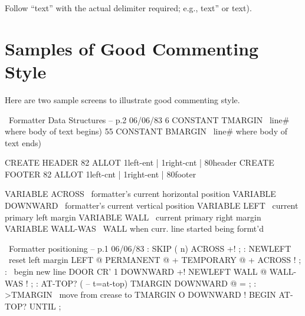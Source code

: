 \noindent Follow ``text'' with the actual delimiter required; e.g., text''
or text).

\section{Samples of Good Commenting Style}

Here are two sample screens to illustrate good commenting
style.

\setcounter{screen}{126}
\begin{Screen}
\ Formatter         Data Structures -- p.2             06/06/83
 6 CONSTANT TMARGIN \ line# where body of text begins)
55 CONSTANT BMARGIN \ line# where body of text ends)

CREATE HEADER 82 ALLOT
  { 1left-ent | 1right-cnt | 80header }
CREATE FOOTER 82 ALLOT
  { 1left-cnt | 1right-ent | 80footer }

VARIABLE ACROSS   \ formatter's current horizontal position
VARIABLE DOWNWARD \ formatter's current vertical position
VARIABLE LEFT     \ current primary left margin
VARIABLE WALL     \ current primary right margin
VARIABLE WALL-WAS \ WALL when curr. line started being formt'd

\end{Screen}

\begin{Screen}
\ Formatter          positioning -- p.1               06/06/83
: SKIP  ( n)  ACROSS +! ;
: NEWLEFT  \ reset left margin
LEFT @  PERMANENT @ +  TEMPORARY @ +  ACROSS ! ;
: \LINE  \ begin new line
DOOR  CR'  1 DOWNWARD +!  NEWLEFT  WALL @  WALL-WAS ! ;
: AT-TOP?  ( -- t=at-top)  TMARGIN  DOWNWARD @ = ;
: >TMARGIN  \ move from crease to TMARGIN
O DOWNWARD !  BEGIN  \LINE  AT-TOP? UNTIL ;

\end{Screen}

